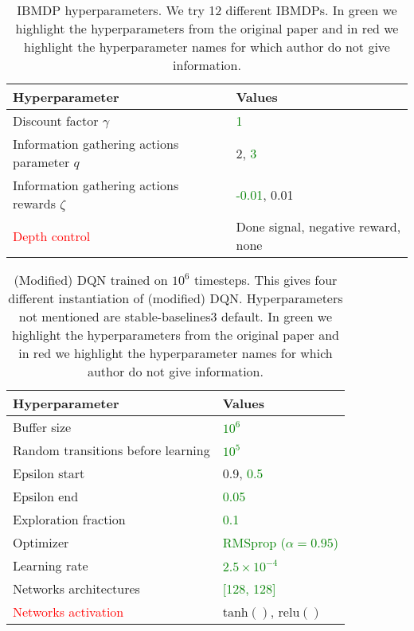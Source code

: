 \begin{table}[H]
    \centering
    \caption{IBMDP hyperparameters. We try 12 different IBMDPs. In green we highlight the hyperparameters from the original paper and in red we highlight the hyperparameter names for which author do not give information.}\label{tab:ibmdp-params}
    \begin{tabular}{ll}
    \toprule
    \textbf{Hyperparameter} & \textbf{Values}\\
    \midrule
    Discount factor $\gamma$ & \textcolor{green}{1} \\
    Information gathering actions parameter $q$ & 2, \textcolor{green}{3} \\
    Information gathering actions rewards $\zeta$ & \textcolor{green}{-0.01}, 0.01 \\
    \textcolor{red}{Depth control} & Done signal, negative reward, none \\ 
    \bottomrule
    \end{tabular}
    \end{table}

\begin{table}[H]
    \centering
    \caption{(Modified) DQN trained on $10^6$ timesteps. This gives four different instantiation of (modified) DQN. Hyperparameters not mentioned are stable-baselines3 default. In green we highlight the hyperparameters from the original paper and in red we highlight the hyperparameter names for which author do not give information.}\label{tab:ibmdp-rl1}
    \begin{tabular}{ll}
    \toprule
    \textbf{Hyperparameter} & \textbf{Values}\\
    \midrule
    Buffer size & \textcolor{green}{$10^6$} \\
    Random transitions before learning & \textcolor{green}{$10^5$} \\
    Epsilon start & 0.9, \textcolor{green}{0.5} \\
    Epsilon end & \textcolor{green}{0.05} \\
    Exploration fraction & \textcolor{green}{0.1} \\
    Optimizer & \textcolor{green}{RMSprop ($\alpha = 0.95$)}\\
    Learning rate & \textcolor{green}{$2.5\times10^{-4}$}\\
    Networks architectures & \textcolor{green}{[128, 128]}\\
    \textcolor{red}{Networks activation} & $\operatorname{tanh()}$, $\operatorname{relu()}$\\
    \bottomrule
    \end{tabular}
    \end{table}

